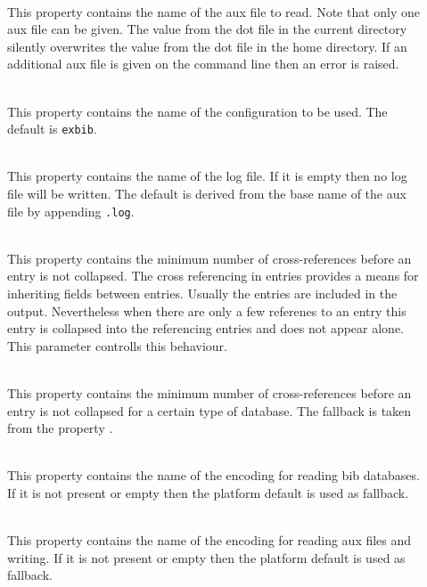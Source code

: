 \begin{description}
\item[] \ \\
  This property contains the name of the aux file to read. Note that
  only one aux file can be given. The value from the dot file in the
  current directory silently overwrites the value from the dot file in
  the home directory. If an additional aux file is given on the
  command line then an error is raised.
\item[] \ \\
  This property contains the name of the configuration to be used. The
  default is \texttt{exbib}.
\item[] \ \\
  This property contains the name of the log file. If it is empty then
  no log file will be written. The default is derived from the base
  name of the aux file by appending \texttt{.log}.
\item[] \ \\
  This property contains the minimum number of cross-references before
  an entry is not collapsed. The cross referencing in entries provides
  a means for inheriting fields between entries. Usually the entries
  are included in the output.  Nevertheless when there are only a few
  referenes to an entry this entry is collapsed into the referencing
  entries and does not appear alone. This parameter controlls this
  behaviour.
\item[] \ \\
  This property contains the minimum number of cross-references before
  an entry is not collapsed for a certain type of database. The
  fallback is taken from the property .
\item[] \ \\
  This property contains the name of the encoding for reading bib
  databases. If it is not present or empty then the platform default
  is used as fallback.
\item[] \ \\
  This property contains the name of the encoding for reading aux
  files and writing. If it is not present or empty then the platform
  default is used as fallback.
\item[] \ \\

\end{description}

